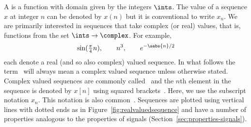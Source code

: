 A  is a function with domain given by the integers $\ints$.  The value of a sequence $x$ at integer $n$ can be denoted by $x(n)$ but it is conventional to write $x_n$.  We are primarily interested in sequences that take complex (or real) values, that is, functions from the set $\ints \to \complex$.  For example,
\[
\sin( \tfrac{\pi}{4} n), \qquad n^3, \qquad e^{-\sabs{n}/2}
\]
each denote a real (and so also complex) valued sequence.  In what follows the term~ will always mean a complex valued sequence unless otherwise stated.  Complex valued sequences are commonly called~ and the $n$th element in the sequence is denoted by $x[n]$ using squared brackets~\citep{Oppenheiim_sigs_sys_1996}.  Here, we use the subscript notation $x_n$. This notation is also common~\citep{vetterli_fund_sig_proc,Rudin_real_and_complex_analysis}.
Sequences are plotted using vertical lines with dotted ends as in Figure~\ref{fig:realvaluedsequence} and have a number of properties analogous to the properties of signals (Section~\ref{sec:properties-signals}).

